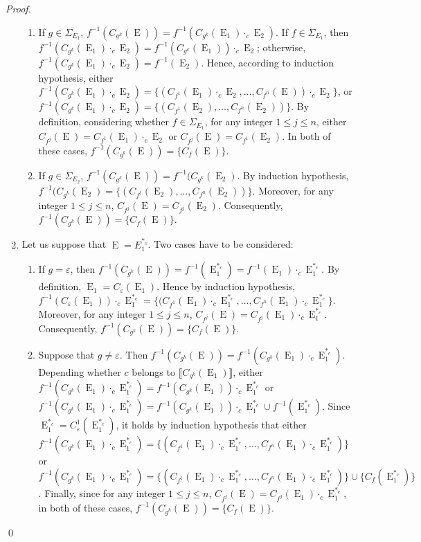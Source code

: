 \documentclass{llncs}
\DeclareMathOperator{\E}{E}
\begin{document}
\begin{proof}
\begin{enumerate}
    \begin{enumerate}
      \item If $g\in \Sigma_{E_1}$, $f^{-1}(C_{g^k}(\E))=f^{-1}(C_{g^k}(\E_1)\cdot_c \E_2)$. If $f\in\Sigma_{E_1}$, then $f^{-1}(C_{g^k}(\E_1)\cdot_c \E_2)=f^{-1}(C_{g^k}(\E_1))\cdot_c \E_2$; otherwise, $f^{-1}(C_{g^k}(\E_1)\cdot_c \E_2)=f^{-1}(\E_2)$. Hence, according to induction hypothesis, either $f^{-1}(C_{g^k}(\E_1)\cdot_c \E_2)=\{(C_{f^1}(\E_1)\cdot_c \E_2,\dots,C_{f^n}(\E))\cdot_c \E_2\}$, or $f^{-1}(C_{g^k}(\E_1)\cdot_c \E_2)=\{(C_{f^1}(\E_2),\dots,C_{f^n}(\E_2))\}$. By definition, considering whether $f\in\Sigma_{E_1}$, for any integer $1\leq j\leq n$, either $C_{f^j}(\E)=C_{f^1}(\E_1)\cdot_c \E_2$ or $C_{f^j}(\E)=C_{f^1}(\E_2)$. In both of these cases, $f^{-1}(C_{g^k}(\E))=\{C_{f}(\E)\}$.
      \item If $g\in \Sigma_{E_2}$, $f^{-1}(C_{g^k}(\E))=f^{-1}(C_{g^k}(\E_2)$. By induction hypothesis, $f^{-1}(C_{g^k}(\E_2)=\{(C_{f^1}(\E_2),\dots,C_{f^n}(\E_2))\}$. Moreover, for any integer $1\leq j\leq n$, $C_{f^j}(\E)=C_{f^j}(\E_2)$. Consequently, $f^{-1}(C_{g^k}(\E))=\{C_{f}(\E)\}$.
    \end{enumerate} 
    \item Let us suppose that $\E=E_1^{*_c}$. Two cases have to be considered:
    \begin{enumerate}
      \item If $g=\varepsilon$, then $f^{-1}(C_{g^k}(\E))=f^{-1}(\E_1^{*_c})=f^{-1}(\E_1)\cdot_c \E_1^{*_c}$. By definition, $\E_1=C_{\varepsilon}(\E_1)$. Hence by induction hypothesis, $f^{-1}(C_{\varepsilon}(\E_1))\cdot_c \E_1^{*_c}=\{(C_{f^1}(\E_1)\cdot_c \E_1^{*_c},\dots,C_{f^n}(\E_1)\cdot_c \E_1^{*_c}\}$.  Moreover, for any integer $1\leq j\leq n$, $C_{f^j}(\E)=C_{f^j}(\E_1)\cdot_c \E_1^{*_c}$. Consequently, $f^{-1}(C_{g^k}(\E))=\{C_{f}(\E)\}$.
      \item Suppose that $g\neq\varepsilon$. Then $f^{-1}(C_{g^k}(\E))=f^{-1}(C_{g^k}(\E_1)\cdot_c \E_1^{*_c})$. Depending whether $c$ belongs to $\llbracket C_{g^k}(\E_1) \rrbracket$, either $f^{-1}(C_{g^k}(\E_1)\cdot_c \E_1^{*_c})=f^{-1}(C_{g^k}(\E_1)) \cdot_c \E_1^{*_c}$  or $f^{-1}(C_{g^k}(\E_1)\cdot_c \E_1^{*_c})=f^{-1}(C_{g^k}(\E_1)) \cdot_c \E_1^{*_c} \cup f^{-1}(\E_1^{*_c})$.  Since $\E_1^{*_c}=C_\varepsilon^1(\E_1^{*_c})$, it holds by induction hypothesis that either $f^{-1}(C_{g^k}(\E_1)\cdot_c \E_1^{*_c})=\{(C_{f^1}(\E_1)\cdot_c \E_1^{*_c},\dots,C_{f^n}(\E_1)\cdot_c \E_1^{*_c})\}$  or $f^{-1}(C_{g^k}(\E_1)\cdot_c \E_1^{*_c})=\{(C_{f^1}(\E_1)\cdot_c \E_1^{*_c},\dots,C_{f^n}(\E_1)\cdot_c \E_1^{*_c})\} \cup \{C_{f}(\E_1^{*_c})\}$. Finally, since  for any integer $1\leq j\leq n$, $C_{f^j}(\E)=C_{f^j}(\E_1)\cdot_c \E_1^{*_c}$, in both of these cases, $f^{-1}(C_{g^k}(\E))=\{C_{f}(\E)\}$.
    \end{enumerate}
  \end{enumerate}
 \qed
\end{proof}
\end{document}

